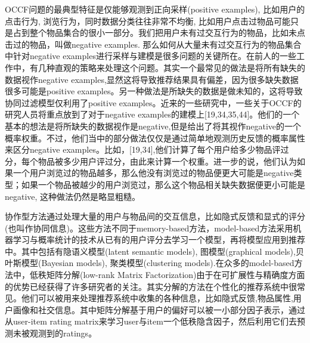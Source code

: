 OCCF问题的最典型特征是仅能够观测到正向采样(positive examples), 比如用户的点击行为, 浏览行为，同时数据分类往往非常不均衡, 比如用户点击过物品可能只是占到整个物品集合的很小一部分。我们把用户未有过交互行为的物品，比如未点击过的物品，叫做negative examples. 那么如何从大量未有过交互行为的物品集合中针对negative examples进行采样与建模是很多问题的关键所在。在前人的一些工作中，有几种直观的策略来处理这个问题。其实一个最常见的做法是将所有缺失的数据视作negative examples,显然这将导致推荐结果具有偏差，因为很多缺失数据很多可能是positive examples。另一种做法是所缺失的数据是做未知的，这将导致协同过滤模型仅利用了positive examples。近来的一些研究中，一些关于OCCF的研究人员将重点放到了对于negative examples的建模上[19,34,35,44]。他们的一个基本的想法是将所缺失的数据视作是negative,但是给出了将其视作negative的一个概率权重。不过，他们当中的部分做法仅仅是通过简单地观测历史反馈的概率属性来区分negative examples。比如，[19,34],他们计算了每个用户给多少物品评过分，每个物品被多少用户评过分，由此来计算一个权重。进一步的说，他们认为如果一个用户浏览过的物品越多，那么他没有浏览过的物品便更大可能是negative类型；如果一个物品被越少的用户浏览过，那么这个物品相关缺失数据便更小可能是negative, 这种做法仍然是略显粗糙。

协作型方法\cite{rendle2009bpr,yu2013recommendation,zhong2014adaptive}通过处理大量的用户与物品间的交互信息，比如隐式反馈和显式的评分(也叫作协同信息)。这些方法不同于memory-based方法，model-based方法采用机器学习与概率统计的技术从已有的用户评分去学习一个模型，再将模型应用到推荐中。其中包括有隐语义模型(latent semantic models), 图模型(graphical models),贝叶斯模型(Bayesian models), 聚类模型(clustering models).在众多的model-based方法中，低秩矩阵分解(low-rank Matrix Factorization)由于在可扩展性与精确度方面的优势已经获得了许多研究者的关注。其实分解的方法在个性化的推荐系统中很常见。他们可以被用来处理推荐系统中收集的各种信息，比如隐式反馈\cite{hu2008collaborative,rendle2009bpr},物品属性\cite{gantner2010learning,rendle2012factorization},用户画像\cite{hong2013co}和社交信息\cite{ma2011recommender}。其中矩阵分解基于用户的偏好可以被一小部分因子表示，通过从user-item rating matrix来学习user与item一个低秩隐含因子，然后利用它们去预测未被观测到的ratings。

